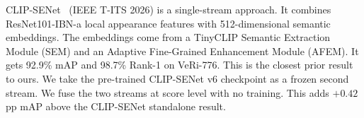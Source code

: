 CLIP-SENet~\cite{lu2025clipsenet} (IEEE T-ITS 2026) is a single-stream approach. It combines ResNet101-IBN-a local appearance features with 512-dimensional semantic embeddings. The embeddings come from a TinyCLIP Semantic Extraction Module (SEM) and an Adaptive Fine-Grained Enhancement Module (AFEM). It gets 92.9\% mAP and 98.7\% Rank-1 on VeRi-776. This is the closest prior result to ours. We take the pre-trained CLIP-SENet v6 checkpoint as a frozen second stream. We fuse the two streams at score level with no training. This adds $+0.42$\,pp mAP above the CLIP-SENet standalone result.

